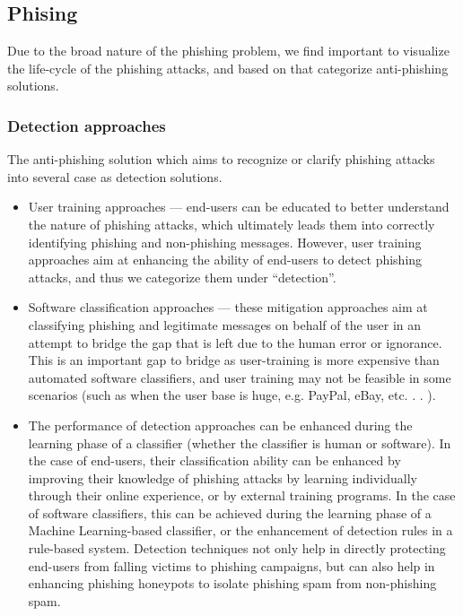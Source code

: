 \documentclass{ijitcs}
\begin{document}
\subsection{Phising}
Due to the broad nature of the phishing problem, we find important to visualize the life-cycle of the phishing attacks, and based on that categorize anti-phishing solutions.




\subsubsection{Detection approaches}
The anti-phishing solution which
aims to recognize or clarify phishing attacks into several case as detection
solutions.








\begin{itemize}
\item User training approaches --- end-users can be educated
to better understand the nature of phishing attacks, which
ultimately leads them into correctly identifying phishing
and non-phishing messages. However, user training approaches
aim at enhancing the ability of end-users to detect
phishing attacks, and thus we categorize them under
“detection”.
\item  Software classification approaches --- these mitigation
approaches aim at classifying phishing and legitimate
messages on behalf of the user in an attempt to bridge
the gap that is left due to the human error or ignorance.
This is an important gap to bridge as user-training is more
expensive than automated software classifiers, and user training may not be feasible in some scenarios (such as
when the user base is huge, e.g. PayPal, eBay, etc. . . ).
\item The performance of detection approaches can be enhanced
during the learning phase of a classifier (whether the classifier
is human or software). In the case of end-users, their classification ability can be enhanced by improving their knowledge
of phishing attacks by learning individually through their
online experience, or by external training programs. In the
case of software classifiers, this can be achieved during the
learning phase of a Machine Learning-based classifier, or the
enhancement of detection rules in a rule-based system.
Detection techniques not only help in directly protecting
end-users from falling victims to phishing campaigns, but can
also help in enhancing phishing honeypots
to isolate phishing
spam from non-phishing spam.\cite{khonji2013phishing}
\end{itemize}
\end{document}
